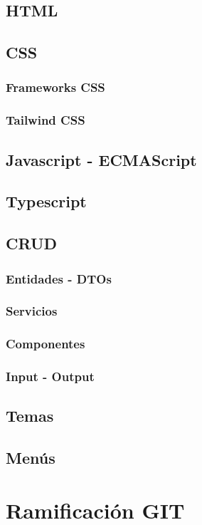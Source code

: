 \subsection{HTML}
\subsection{CSS}
\subsubsection{Frameworks CSS}
\subsubsection{Tailwind CSS}
\subsection{Javascript - ECMAScript}
\subsection{Typescript}
\subsection{CRUD}
\subsubsection{Entidades - DTOs}
\subsubsection{Servicios}
\subsubsection{Componentes}
\subsubsection{Input - Output}
\subsection{Temas}
\subsection{Menús}
\section{Ramificación GIT}
